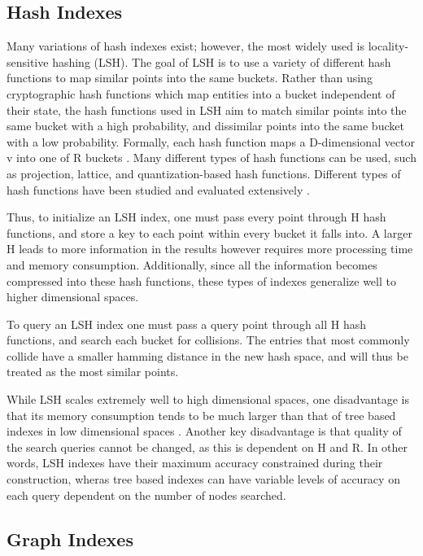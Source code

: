 \subsection{Hash Indexes}
\label{sec:hashind}

Many variations of hash indexes exist; however, the most widely used is locality-sensitive hashing (LSH).  The goal of LSH is to use a variety of different hash functions to map similar points into the same buckets.  Rather than using cryptographic hash functions which map entities into a bucket independent of their state, the hash functions used in LSH aim to match similar points into the same bucket with a high probability, and dissimilar points into the same bucket with a low probability.  Formally, each hash function maps a D-dimensional vector v into one of R buckets \citep{datar2004locality}.  Many different types of hash functions can be used, such as projection, lattice, and quantization-based hash functions.  Different types of hash functions have been studied and evaluated extensively \citep{pauleve2010locality}.

Thus, to initialize an LSH index, one must pass every point through H hash functions, and store a key to each point within every bucket it falls into.  A larger H leads to more information in the results however requires more processing time and memory consumption.  Additionally, since all the information becomes compressed into these hash functions, these types of indexes generalize well to higher dimensional spaces.

To query an LSH index one must pass a query point through all H hash functions, and search each bucket for collisions.  The entries that most commonly collide have a smaller hamming distance in the new hash space, and will thus be treated as the most similar points.

While LSH scales extremely well to high dimensional spaces, one disadvantage is that its memory consumption tends to be much larger than that of tree based indexes in low dimensional spaces \citep{datar2004locality}.  Another key disadvantage is that quality of the search queries cannot be changed, as this is dependent on H and R.  In other words, LSH indexes have their maximum accuracy constrained during their construction, wheras tree based indexes can have variable levels of accuracy on each query dependent on the number of nodes searched.

\subsection{Graph Indexes}
\label{sec:graphind}

